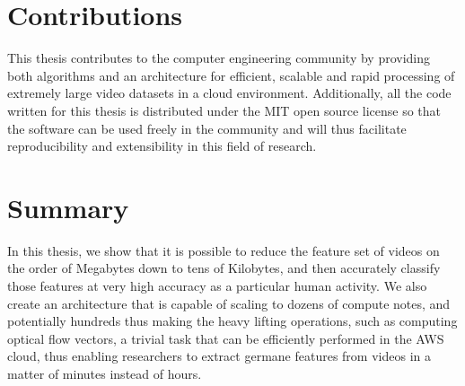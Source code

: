 \section{\label{section:contributions}Contributions}
This thesis contributes to the computer engineering community by providing both
algorithms and an architecture for efficient, scalable and rapid processing of
extremely large video datasets in a cloud environment. Additionally, all
the code written for this thesis is distributed under the MIT open source license
so that the software can be used freely in the community and will thus facilitate
reproducibility and extensibility in this field of research.

\section{\label{section:summary}Summary}
In this thesis, we show that it is possible to reduce the feature set of videos
on the order of Megabytes down to tens of Kilobytes, and then accurately
classify those features at very high accuracy as a particular human activity. We
also create an architecture that is capable of scaling to dozens of compute
notes, and potentially hundreds thus making the heavy lifting operations, such
as computing optical flow vectors, a trivial task that can be efficiently
performed in the AWS cloud, thus enabling researchers to extract germane
features from videos in a matter of minutes instead of hours.
